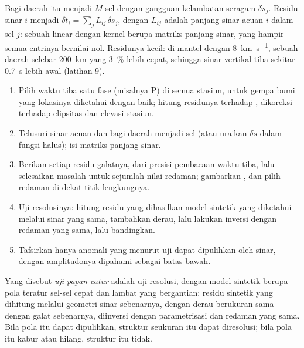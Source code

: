 Bagi daerah itu menjadi $M$ sel dengan gangguan kelambatan seragam $\delta s_j$.
Residu sinar $i$ menjadi $\delta t_i = \sum_j L_{ij}\,\delta s_j$, dengan
$L_{ij}$ adalah panjang sinar acuan $i$ dalam sel $j$: sebuah  linear
dengan kernel berupa matriks panjang sinar, yang hampir semua entrinya
bernilai nol. Residunya kecil: di mantel dengan
\qty{8}{km.s^{-1}}, sebuah daerah selebar \qty{200}{km} yang \qty{3}{\percent}
lebih cepat, sehingga sinar vertikal tiba sekitar \qty{0.7}{s} lebih awal (latihan 9).

\begin{method}\label{met:b3:seismology-imaging:tomo}
\begin{enumerate}
  \item Pilih waktu tiba satu fase (misalnya P) di semua stasiun, untuk
        gempa bumi yang lokasinya diketahui dengan baik; hitung residunya
        terhadap , dikoreksi terhadap elipsitas dan
        elevasi stasiun.
  \item Telusuri sinar acuan dan bagi daerah menjadi sel (atau
        uraikan $\delta s$ dalam fungsi halus); isi matriks panjang sinar.
  \item Berikan setiap residu galatnya, dari presisi pembacaan waktu tiba, lalu selesaikan
        masalah  untuk sejumlah nilai redaman; gambarkan
        , dan pilih redaman di dekat titik lengkungnya.
  \item Uji resolusinya: hitung residu yang dihasilkan model sintetik yang diketahui
        melalui sinar yang sama, tambahkan derau, lalu lakukan inversi dengan
        redaman yang sama, lalu bandingkan.
  \item Tafsirkan hanya anomali yang menurut uji dapat dipulihkan
        oleh sinar, dengan amplitudonya dipahami sebagai batas bawah.
\end{enumerate}
\end{method}

\begin{definition}\label{def:b3:seismology-imaging:checkerboard}
Yang disebut \emph{uji papan catur} adalah uji resolusi,
dengan model sintetik berupa pola teratur sel-sel cepat dan lambat yang bergantian:
residu sintetik yang dihitung melalui geometri sinar sebenarnya, dengan derau
berukuran sama dengan galat sebenarnya, diinversi dengan parametrisasi dan
redaman yang sama. Bila pola itu dapat dipulihkan, struktur seukuran itu dapat
diresolusi; bila pola itu kabur atau hilang, struktur itu tidak.
\end{definition}

